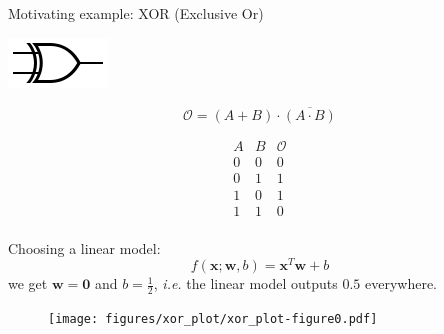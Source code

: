 \documentclass[]{beamer}
\begin{document}
\begin{frame}
   {Motivating example: XOR (Exclusive Or)}
   \scriptsize
   \vspace{-0.2cm}
   \begin{minipage}{0.32\linewidth}
      \centering
      \includegraphics[width=0.7\linewidth]{figures/xor_gate.png}
   \end{minipage}
   \begin{minipage}{0.32\linewidth}
      \centering
      \begin{equation*}
         \mathcal{O} = \left(A + B \right) \cdot \overline{\left( A \cdot B \right)}
      \end{equation*}
   \end{minipage}
   \begin{minipage}{0.32\linewidth}
      \centering
      \begin{equation*}
         \begin{array}{ccc}
            A & B & \mathcal{O} \\ \hline
            0 & 0 & 0 \\
            0 & 1 & 1 \\
            1 & 0 & 1 \\
            1 & 1 & 0 \\
         \end{array}
      \end{equation*}
   \end{minipage}
   \vspace{0.2cm}
   Choosing a linear model:
   \begin{equation*}
      f \left(\boldsymbol{x}; \boldsymbol{w}, b \right) = \boldsymbol{x}^T \boldsymbol{w} + b
   \end{equation*}
   we get $\boldsymbol{w} = \boldsymbol{0}$ and $b = \frac{1}{2}$, \emph{i.e.} the linear model outputs $0.5$ everywhere.
   
   \vspace{0.2cm}
   \begin{figure}
      \centering
      \texttt{[image: figures/xor\_plot/xor\_plot-figure0.pdf]}
   \end{figure}
\end{frame}
\end{document}
